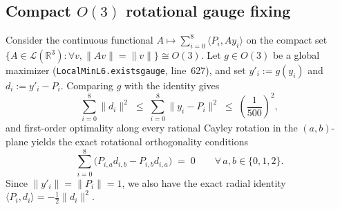 \documentclass[11pt,reqno]{amsart}
\renewcommand{\_}{\origunderscore\allowbreak}
\theoremstyle{definition}
\newcommand{\R}{\mathbb{R}}
\newcommand{\ip}[2]{\langle #1, #2 \rangle}
\newcommand{\norm}[1]{\lVert #1 \rVert}
\begin{document}
\subsection{Compact $O(3)$ rotational gauge fixing}\label{subsec:gauge}
Consider the continuous functional $A \mapsto \sum_{i=0}^8 \ip{P_i}{A y_i}$ on the compact set $\{A \in \mathcal{L}(\R^3) : \forall v, \norm{Av} = \norm{v}\} \cong O(3)$.
Let $g \in O(3)$ be a global maximizer (\texttt{LocalMinL6.exists\_gauge}, line~627), and set $y'_i := g(y_i)$ and $d_i := y'_i - P_i$.
Comparing $g$ with the identity gives
\[
  \sum_{i=0}^8 \norm{d_i}^2 \;\le\; \sum_{i=0}^8 \norm{y_i - P_i}^2 \;\le\; \left(\frac{1}{500}\right)^2,
\]
and first-order optimality along every rational Cayley rotation in the $(a,b)$-plane yields the exact rotational orthogonality conditions
\begin{equation}\label{eq:rot-gauge}
  \sum_{i=0}^8 \bigl(P_{i,a} d_{i,b} - P_{i,b} d_{i,a}\bigr) \;=\; 0 \qquad \forall\, a,b \in \{0,1,2\}.
\end{equation}
Since $\norm{y'_i} = \norm{P_i} = 1$, we also have the exact radial identity $\ip{P_i}{d_i} = -\frac{1}{2}\norm{d_i}^2$.
\end{document}
